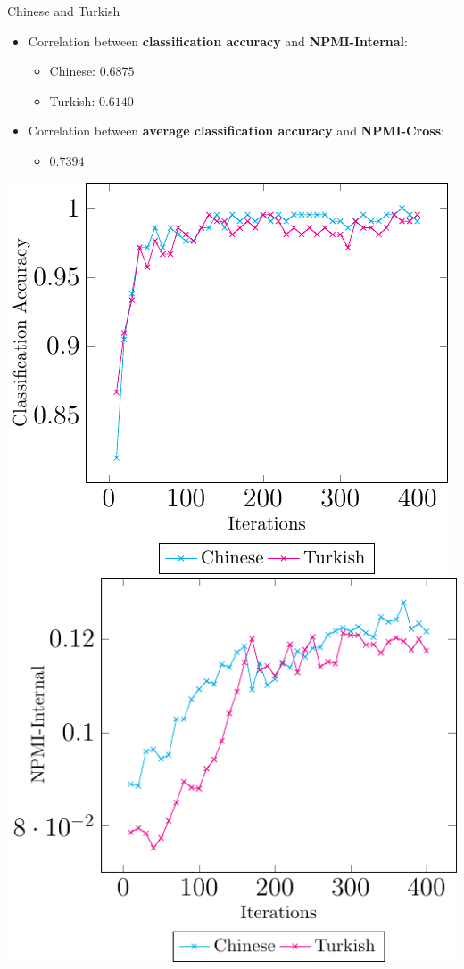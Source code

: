 \documentclass[compress]{beamer}
\begin{document}
	\begin{frame}{Chinese and Turkish}
		\begin{itemize}
			\item Correlation between \textbf{classification accuracy} and \textbf{NPMI-Internal}:
				\begin{itemize}
					\item Chinese: $0.6875$
					\item Turkish: $0.6140$
				\end{itemize}
			\item Correlation between \textbf{average classification accuracy} and \textbf{NPMI-Cross}:
				\begin{itemize}
					\item $0.7394$
				\end{itemize}			
		\end{itemize}
		\begin{center}
			\includegraphics[height=0.5\textheight]{multilingual_itm/clf-cmn-tr.pdf}
			\includegraphics[height=0.5\textheight]{multilingual_itm/npmi-cmn-tr.pdf}
		\end{center}
	\end{frame}	
\end{document}
